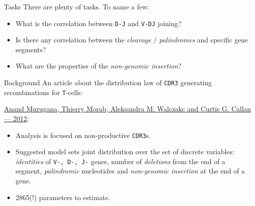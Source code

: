 \documentclass{beamer}\usepackage[]{graphicx}\usepackage[]{color}
\begin{document}
%  

\begin{frame}{Tasks}
  There are plenty of tasks. To name a few:
  \begin{itemize}
    \item What is the correlation between \texttt{D-J} and \texttt{V-DJ} joining?
    \item Is there any correlation between the \textit{cleavage} / \textit{palindromes} and specific gene segments?  
    \item What are the properties of the \textit{non-genomic insertion}?
  \end{itemize}
\end{frame}

\begin{frame}{Background}
  An article about the distribution law of \texttt{CDR3} generating recombinations for \texttt{T}-cells:
  
  \href{http://www.pnas.org/content/109/40/16161.full}{%
  Anand Murugana, Thierry Morab, Aleksandra M. Walczakc and Curtis G. Callan --- 2012}:
  \begin{itemize}
    \item Analysis is focused on non-productive \texttt{CDR3}s.
    \item Suggested model sets joint distribution over the set of discrete variables: \textit{identities} of \texttt{V-, D-, J-} genes, number of \textit{deletions} from the end of a segment, \textit{palindromic} nucleotides and \textit{non-genomic insertion} at the end of a gene.
    \pause
  \item {\color{blue} 2865(!) parameters to estimate.}
  \end{itemize}
\end{frame}
\end{document}
